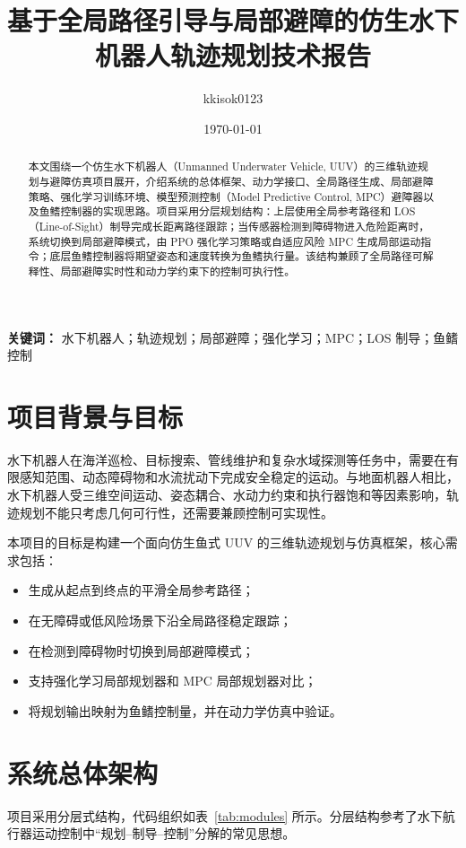 \documentclass[UTF8,a4paper,12pt]{ctexart}
\title{\textbf{基于全局路径引导与局部避障的仿生水下机器人轨迹规划技术报告}}
\author{kkisok0123}
\date{\today}
\begin{document}
\maketitle

\begin{abstract}
本文围绕一个仿生水下机器人（Unmanned Underwater Vehicle, UUV）的三维轨迹规划与避障仿真项目展开，介绍系统的总体框架、动力学接口、全局路径生成、局部避障策略、强化学习训练环境、模型预测控制（Model Predictive Control, MPC）避障器以及鱼鳍控制器的实现思路。项目采用分层规划结构：上层使用全局参考路径和 LOS（Line-of-Sight）制导完成长距离路径跟踪；当传感器检测到障碍物进入危险距离时，系统切换到局部避障模式，由 PPO 强化学习策略或自适应风险 MPC 生成局部运动指令；底层鱼鳍控制器将期望姿态和速度转换为鱼鳍执行量。该结构兼顾了全局路径可解释性、局部避障实时性和动力学约束下的控制可执行性。
\end{abstract}

\textbf{关键词：} 水下机器人；轨迹规划；局部避障；强化学习；MPC；LOS 制导；鱼鳍控制

\section{项目背景与目标}

水下机器人在海洋巡检、目标搜索、管线维护和复杂水域探测等任务中，需要在有限感知范围、动态障碍物和水流扰动下完成安全稳定的运动。与地面机器人相比，水下机器人受三维空间运动、姿态耦合、水动力约束和执行器饱和等因素影响，轨迹规划不能只考虑几何可行性，还需要兼顾控制可实现性。

本项目的目标是构建一个面向仿生鱼式 UUV 的三维轨迹规划与仿真框架，核心需求包括：

\begin{itemize}
  \item 生成从起点到终点的平滑全局参考路径；
  \item 在无障碍或低风险场景下沿全局路径稳定跟踪；
  \item 在检测到障碍物时切换到局部避障模式；
  \item 支持强化学习局部规划器和 MPC 局部规划器对比；
  \item 将规划输出映射为鱼鳍控制量，并在动力学仿真中验证。
\end{itemize}

\section{系统总体架构}

项目采用分层式结构，代码组织如表~\ref{tab:modules} 所示。分层结构参考了水下航行器运动控制中“规划--制导--控制”分解的常见思想\cite{fossen2011handbook}。
\end{document}
